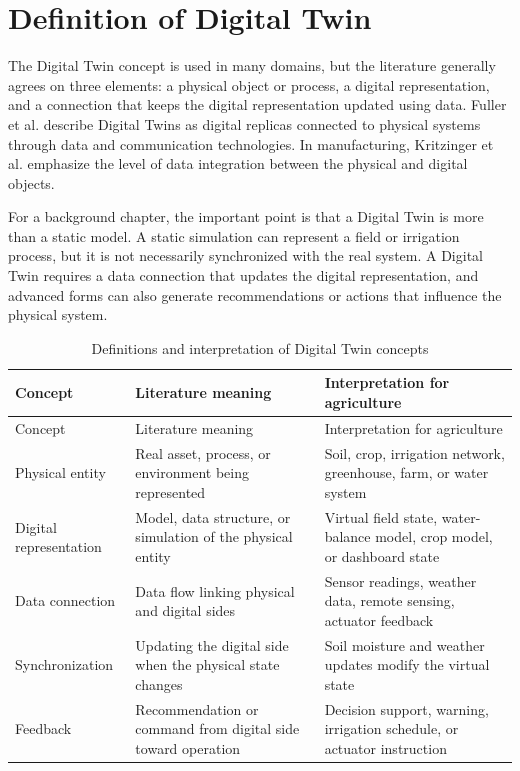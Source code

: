 \section{Definition of Digital Twin}

The Digital Twin concept is used in many domains, but the literature generally agrees on three elements: a physical object or process, a digital representation, and a connection that keeps the digital representation updated using data. Fuller et al. \cite{fuller2020digitaltwin} describe Digital Twins as digital replicas connected to physical systems through data and communication technologies. In manufacturing, Kritzinger et al. \cite{kritzinger2018digitaltwin} emphasize the level of data integration between the physical and digital objects.

For a background chapter, the important point is that a Digital Twin is more than a static model. A static simulation can represent a field or irrigation process, but it is not necessarily synchronized with the real system. A Digital Twin requires a data connection that updates the digital representation, and advanced forms can also generate recommendations or actions that influence the physical system.

\begin{footnotesize}
\setlength{\tabcolsep}{2pt}
\begin{longtable}{@{}>{\raggedright\arraybackslash}p{}>{\raggedright\arraybackslash}p{}>{\raggedright\arraybackslash}p{}@{}}
\caption{Definitions and interpretation of Digital Twin concepts}\\
\toprule
Concept & Literature meaning & Interpretation for agriculture \\
\midrule
\endfirsthead
\toprule
Concept & Literature meaning & Interpretation for agriculture \\
\midrule
\endhead
Physical entity & Real asset, process, or environment being represented & Soil, crop, irrigation network, greenhouse, farm, or water system \\
Digital representation & Model, data structure, or simulation of the physical entity & Virtual field state, water-balance model, crop model, or dashboard state \\
Data connection & Data flow linking physical and digital sides & Sensor readings, weather data, remote sensing, actuator feedback \\
Synchronization & Updating the digital side when the physical state changes & Soil moisture and weather updates modify the virtual state \\
Feedback & Recommendation or command from digital side toward operation & Decision support, warning, irrigation schedule, or actuator instruction \\
\bottomrule
\end{longtable}
\end{footnotesize}

